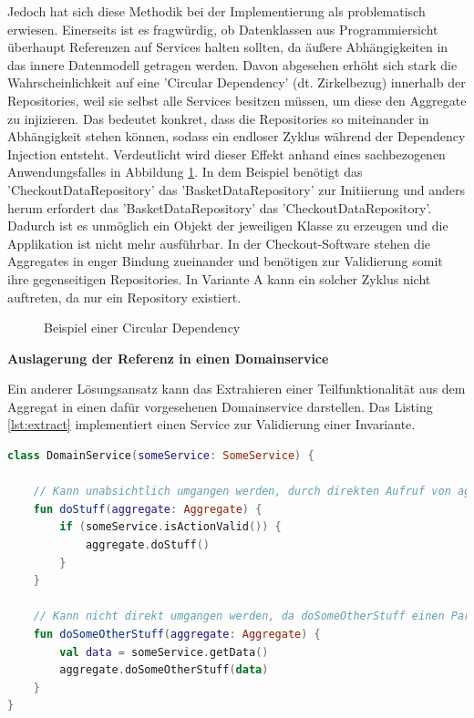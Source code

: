 Jedoch hat sich diese Methodik bei der Implementierung als problematisch erwiesen. Einerseits ist es fragwürdig, ob Datenklassen aus Programmiersicht überhaupt Referenzen auf Services halten sollten, da äußere Abhängigkeiten in das innere Datenmodell getragen werden. Davon abgesehen erhöht sich stark die Wahrscheinlichkeit auf eine 'Circular Dependency' (dt. Zirkelbezug) innerhalb der Repositories, weil sie selbst alle Services besitzen müssen, um diese den Aggregate zu injizieren. Das bedeutet konkret, dass die Repositories so miteinander in Abhängigkeit stehen können, sodass ein endloser Zyklus während der Dependency Injection entsteht. Verdeutlicht wird dieser Effekt anhand eines sachbezogenen Anwendungsfalles in Abbildung \ref{fig:CircularDependency}. In dem Beispiel benötigt das 'CheckoutDataRepository' das 'BasketDataRepository' zur Initiierung und anders herum erfordert das 'BasketDataRepository' das 'CheckoutDataRepository'. Dadurch ist es unmöglich ein Objekt der jeweiligen Klasse zu erzeugen und die Applikation ist nicht mehr ausführbar. In der Checkout-Software stehen die Aggregates in enger Bindung zueinander und benötigen zur Validierung somit ihre gegenseitigen Repositories. In Variante A kann ein solcher Zyklus nicht auftreten, da nur ein Repository existiert.

\begin{figure}[htbp]
	\centering
	
	\caption{Beispiel einer Circular Dependency}
	\label{fig:CircularDependency}
\end{figure}

\textbf{Auslagerung der Referenz in einen Domainservice}

Ein anderer Lösungsansatz kann das Extrahieren einer Teilfunktionalität aus dem Aggregat in einen dafür vorgesehenen Domainservice darstellen. Das Listing \ref{lst:extract} implementiert einen Service zur Validierung einer Invariante. 

\begin{minipage}{\linewidth} %
	\begin{lstlisting}[caption={Auslagerung der Referenz in einen Domainservice}, label={lst:extract}, language=Kotlin]
class DomainService(someService: SomeService) {
	
	// Kann unabsichtlich umgangen werden, durch direkten Aufruf von aggregate.doStuff()
	fun doStuff(aggregate: Aggregate) {
		if (someService.isActionValid()) {     
			aggregate.doStuff()
		}
	}

	// Kann nicht direkt umgangen werden, da doSomeOtherStuff einen Parameter erwartet
	fun doSomeOtherStuff(aggregate: Aggregate) {
		val data = someService.getData()
		aggregate.doSomeOtherStuff(data)        
	}
}
	\end{lstlisting}
\end{minipage}

